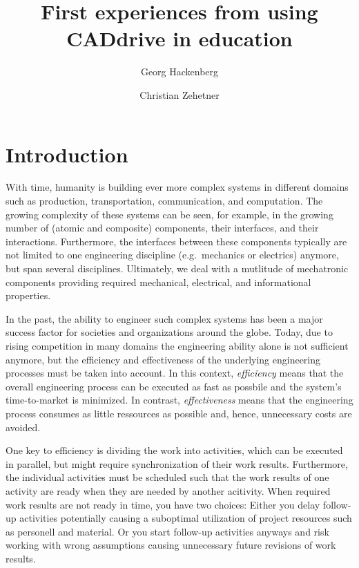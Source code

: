 \documentclass{PDS}
\begin{document}
\title{First experiences from using CADdrive in education}

\author{Georg Hackenberg}
\author{Christian Zehetner}

\address{School of Engineering, University of Applied Sciences Upper Austria, 4600 Wels, Austria}




\maketitle

\section{Introduction}
\label{sec:introduction}

With time, humanity is building ever more complex systems in different domains such as production, transportation, communication, and computation.
The growing complexity of these systems can be seen, for example, in the growing number of (atomic and composite) components, their interfaces, and their interactions.
Furthermore, the interfaces between these components typically are not limited to one engineering discipline (e.g.\ mechanics or electrics) anymore, but span several disciplines.
Ultimately, we deal with a mutlitude of mechatronic components providing required mechanical, electrical, and informational properties.

In the past, the ability to engineer such complex systems has been a major success factor for societies and organizations around the globe.
Today, due to rising competition in many domains the engineering ability alone is not sufficient anymore, but the efficiency and effectiveness of the underlying engineering processes must be taken into account.
In this context, \textit{efficiency} means that the overall engineering process can be executed as fast as possbile and the system's time-to-market is minimized.
In contrast, \textit{effectiveness} means that the engineering process consumes as little ressources as possible and, hence, unnecessary costs are avoided.

One key to efficiency is dividing the work into activities, which can be executed in parallel, but might require synchronization of their work results.
Furthermore, the individual activities must be scheduled such that the work results of one activity are ready when they are needed by another acitivity.
When required work results are not ready in time, you have two choices:
Either you delay follow-up activities potentially causing a suboptimal utilization of project resources such as personell and material.
Or you start follow-up activities anyways and risk working with wrong assumptions causing unnecessary future revisions of work results.
\end{document}
